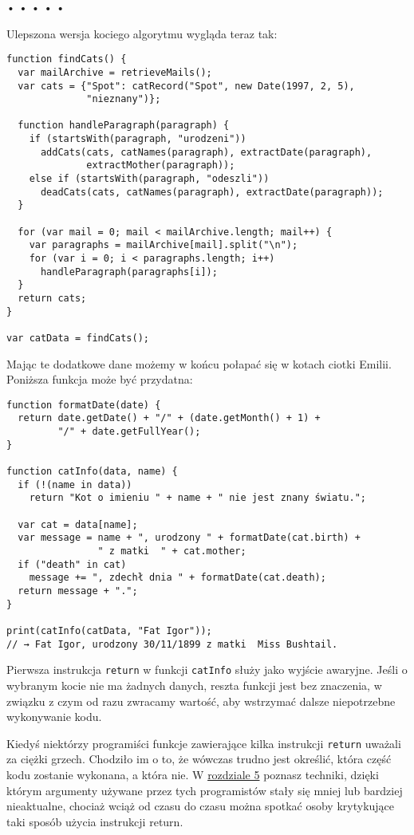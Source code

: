   
\begin{center}
• • • • •
\end{center}
  
    
Ulepszona wersja kociego algorytmu wygląda teraz tak:

    
\begin{verbatim} 
function findCats() {
  var mailArchive = retrieveMails();
  var cats = {"Spot": catRecord("Spot", new Date(1997, 2, 5),
              "nieznany")};

  function handleParagraph(paragraph) {
    if (startsWith(paragraph, "urodzeni"))
      addCats(cats, catNames(paragraph), extractDate(paragraph),
              extractMother(paragraph));
    else if (startsWith(paragraph, "odeszli"))
      deadCats(cats, catNames(paragraph), extractDate(paragraph));
  }

  for (var mail = 0; mail < mailArchive.length; mail++) {
    var paragraphs = mailArchive[mail].split("\n");
    for (var i = 0; i < paragraphs.length; i++)
      handleParagraph(paragraphs[i]);
  }
  return cats;
}

var catData = findCats();
 \end{verbatim}
    
Mając te dodatkowe dane możemy w końcu połapać się w kotach ciotki Emilii. Poniższa funkcja może być przydatna:

    
\begin{verbatim} 
function formatDate(date) {
  return date.getDate() + "/" + (date.getMonth() + 1) +
         "/" + date.getFullYear();
}

function catInfo(data, name) {
  if (!(name in data))
    return "Kot o imieniu " + name + " nie jest znany światu.";

  var cat = data[name];
  var message = name + ", urodzony " + formatDate(cat.birth) +
                " z matki  " + cat.mother;
  if ("death" in cat)
    message += ", zdechł dnia " + formatDate(cat.death);
  return message + ".";
}

print(catInfo(catData, "Fat Igor"));
// → Fat Igor, urodzony 30/11/1899 z matki  Miss Bushtail.
\end{verbatim}
    
Pierwsza instrukcja \texttt{return} w funkcji \texttt{catInfo} służy jako wyjście awaryjne. Jeśli o wybranym kocie nie ma żadnych danych, reszta funkcji jest bez znaczenia, w związku z czym od razu zwracamy wartość, aby wstrzymać dalsze niepotrzebne wykonywanie kodu.

    
Kiedyś niektórzy programiści funkcje zawierające kilka instrukcji \texttt{return} uważali za ciężki grzech. Chodziło im o to, że wówczas trudno jest określić, która część kodu zostanie wykonana, a która nie. W \hyperref[chap:5]{rozdziale 5} poznasz techniki, dzięki którym argumenty używane przez tych programistów stały się mniej lub bardziej nieaktualne, chociaż wciąż od czasu do czasu można spotkać osoby krytykujące taki sposób użycia instrukcji return.

